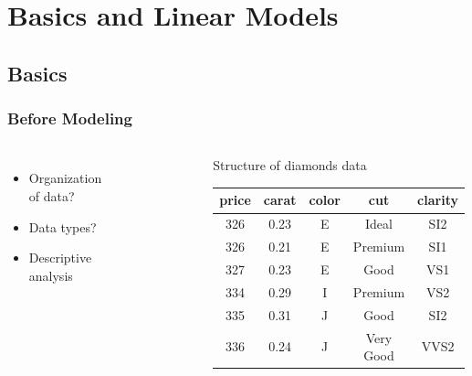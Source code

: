 \documentclass[
    utf8,
    aspectratio=169
]{beamer}  %
\begin{document}
\section{Basics and Linear Models}

\subsection{Basics}

\begin{frame}
\frametitle{Before Modeling}
\begin{columns}
	\begin{itemize}
		\item Organization of data?
		\item Data types?
		\item Descriptive analysis
	\end{itemize}
	\begin{figure}
		\includegraphics[width=0.6\textwidth]{pics/diamond.jpg}
	\end{figure}
	\begin{block}{Structure of diamonds data}
	\begin{table}
		\begin{tabular}{ccccc}
			\hline
			price &carat &color &cut  & clarity \\
			\hline
			326&  0.23& E&     Ideal&     SI2   \\ 
			326&  0.21& E&     Premium&   SI1   \\ 
			327&  0.23& E&     Good  &    VS1   \\ 
			334&  0.29& I&     Premium&   VS2   \\ 
			335&  0.31& J&     Good  &    SI2   \\ 
			336&  0.24& J&     Very Good &VVS2 \\
			\hline
		\end{tabular}
	\end{table}
	\end{block}

	\begin{example}
	\end{example}
\end{columns}
\end{frame}
\end{document}
